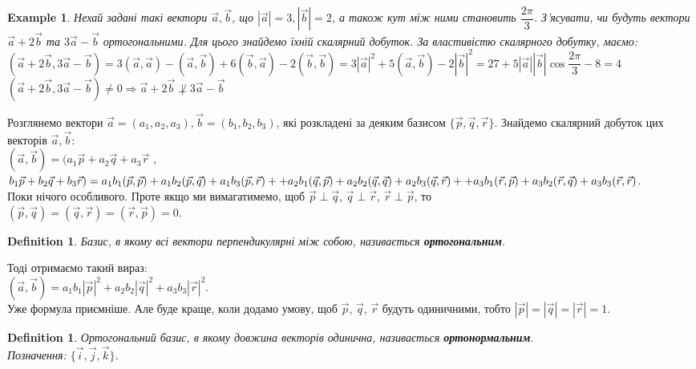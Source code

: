 \documentclass[a4paper, 10pt]{extarticle}
\theoremstyle{theoremdd}
\theoremstyle{theoremdd}
\newtheorem{definition}[theorem]{Definition}
\theoremstyle{theoremdd}
\theoremstyle{theoremdd}
\newtheorem{example}[theorem]{Example}
\theoremstyle{theoremdd}
\theoremstyle{theoremdd}
\theoremstyle{theoremdd}
\theoremstyle{theoremdd}
\begin{document}
\begin{example}
	Нехай задані такі вектори $\vec{a}, \vec{b}$, що $|\vec{a}| = 3, |\vec{b}| = 2$, а також кут між ними становить $\dfrac{2 \pi}{3}$. З'ясувати, чи будуть вектори $\vec{a}+2 \vec{b}$ та $3 \vec{a} - \vec{b}$ ортогональними.
	Для цього знайдемо їхній скалярний добуток.
	За властивістю скалярного добутку, маємо:\\
	$(\vec{a} + 2 \vec{b}, 3 \vec{a} - \vec{b}) = 3 (\vec{a}, \vec{a}) - (\vec{a}, \vec{b}) + 6 (\vec{b}, \vec{a}) - 2 (\vec{b}, \vec{b}) = 3 |\vec{a}|^2 + 5 (\vec{a}, \vec{b}) - 2 |\vec{b}|^2 = 27 + 5 |\vec{a}| |\vec{b}| \cos \dfrac{2 \pi}{3} - 8 = 4$\\
	$(\vec{a} + 2 \vec{b}, 3 \vec{a} - \vec{b}) \neq 0 \Rightarrow \vec{a} + 2 \vec{b} \not\perp 3 \vec{a} - \vec{b}$
\end{example}

	Розглянемо вектори $\vec{a} = (a_1, a_2, a_3), \vec{b} = (b_1, b_2, b_3)$, які розкладені за деяким базисом $\{\vec{p}, \vec{q}, \vec{r}\}$. Знайдемо скалярний добуток цих векторів $\vec{a},\vec{b}$:\\
	$(\vec{a}, \vec{b}) = (a_1\vec{p} + a_2\vec{q} + a_3\vec{r}$ , $b_1\vec{p} + b_2\vec{q} + b_3\vec{r}) = \\
	a_1 b_1 (\vec{p}, \vec{p}) + a_1 b_2 (\vec{p}, \vec{q}) + a_1 b_3 (\vec{p}, \vec{r}) + 
	+ a_2 b_1 (\vec{q}, \vec{p}) + a_2 b_2 (\vec{q}, \vec{q}) + a_2 b_3 (\vec{q}, \vec{r}) + 
	+ a_3 b_1 (\vec{r}, \vec{p}) + a_3 b_2 (\vec{r}, \vec{q}) + a_3 b_3 (\vec{r}, \vec{r})$.\\
	Поки нічого особливого. Проте якщо ми вимагатимемо, щоб $\vec{p} \perp \vec{q}$, $\vec{q} \perp \vec{r}$, $\vec{r} \perp \vec{p}$, то \\
	$(\vec{p}, \vec{q}) = (\vec{q}, \vec{r}) = (\vec{r}, \vec{p}) = 0$.
	
\begin{definition}
	Базис, в якому всі вектори перпендикулярні між собою, називається \textbf{ортогональним}.
\end{definition}

	Тоді отримаємо такий вираз:\\
	$(\vec{a}, \vec{b}) = a_1 b_1 |\vec{p}|^2 + a_2 b_2 |\vec{q}|^2 + a_3 b_3 |\vec{r}|^2$.\\
	Уже формула приємніше. Але буде краще, коли додамо умову, щоб $\vec{p}$, $\vec{q}$, $\vec{r}$ будуть одиничними, тобто $|\vec{p}| = |\vec{q}| = |\vec{r}| = 1$.
	
\begin{definition}
	Ортогональний базис, в якому довжина векторів одинична, називається \textbf{ортонормальним}.\\
	Позначення: $\{\vec{i}, \vec{j}, \vec{k}\}$.
\end{definition}
\end{document}
